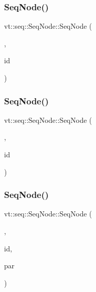 \mbox{\label{structvt_1_1seq_1_1_seq_node_a14943f6562b46ab0ad62eee36ec9a48f}} 
\subsubsection{\texorpdfstring{Seq\+Node()}{SeqNode()}\hspace{0.1cm}{\footnotesize\ttfamily [2/6]}}
{\footnotesize\ttfamily vt\+::seq\+::\+Seq\+Node\+::\+Seq\+Node (\begin{DoxyParamCaption}\item[{Seq\+Node\+Parent\+Tag}]{,  }\item[{\hyperlink{namespacevt_1_1seq_a3b612da217ac669d39c159f134ab8434}{Seq\+Type} const \&}]{id }\end{DoxyParamCaption})}

\mbox{\label{structvt_1_1seq_1_1_seq_node_abdfe423f4bd7ea2880247d446ce47224}} 
\subsubsection{\texorpdfstring{Seq\+Node()}{SeqNode()}\hspace{0.1cm}{\footnotesize\ttfamily [3/6]}}
{\footnotesize\ttfamily vt\+::seq\+::\+Seq\+Node\+::\+Seq\+Node (\begin{DoxyParamCaption}\item[{Seq\+Node\+Leaf\+Tag}]{,  }\item[{\hyperlink{namespacevt_1_1seq_a3b612da217ac669d39c159f134ab8434}{Seq\+Type} const \&}]{id }\end{DoxyParamCaption})}

\mbox{\label{structvt_1_1seq_1_1_seq_node_a619b5b49dc2dce8497582bd7ce695b64}} 
\subsubsection{\texorpdfstring{Seq\+Node()}{SeqNode()}\hspace{0.1cm}{\footnotesize\ttfamily [4/6]}}
{\footnotesize\ttfamily vt\+::seq\+::\+Seq\+Node\+::\+Seq\+Node (\begin{DoxyParamCaption}\item[{Seq\+Node\+Parallel\+Tag}]{,  }\item[{\hyperlink{namespacevt_1_1seq_a3b612da217ac669d39c159f134ab8434}{Seq\+Type} const \&}]{id,  }\item[{\hyperlink{namespacevt_1_1seq_a050106112a0717f8e482465957fb2bfe}{Seq\+Parallel\+Ptr\+Type}}]{par }\end{DoxyParamCaption})}

